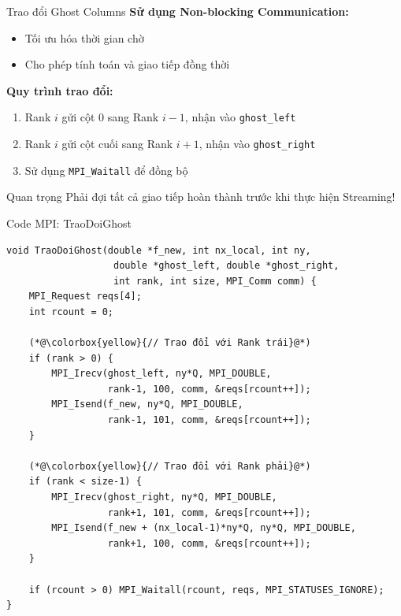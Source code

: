 \documentclass[t, aspectratio=169]{beamer}
\begin{document}
	\begin{frame}{Trao đổi Ghost Columns}
		\textbf{Sử dụng Non-blocking Communication:}
		\begin{itemize}
			\item Tối ưu hóa thời gian chờ
			\item Cho phép tính toán và giao tiếp đồng thời
		\end{itemize}
		
		\vspace{1em}
		
		\textbf{Quy trình trao đổi:}
		\begin{enumerate}
			\item Rank $i$ gửi cột 0 sang Rank $i-1$, nhận vào \texttt{ghost\_left}
			\item Rank $i$ gửi cột cuối sang Rank $i+1$, nhận vào \texttt{ghost\_right}
			\item Sử dụng \texttt{MPI\_Waitall} để đồng bộ
		\end{enumerate}
		
		\vspace{1em}
		
		\begin{alertblock}{Quan trọng}
			Phải đợi tất cả giao tiếp hoàn thành trước khi thực hiện Streaming!
		\end{alertblock}
	\end{frame}
	
	\begin{frame}[fragile]{Code MPI: TraoDoiGhost}
		\begin{lstlisting}[caption={Hàm trao đổi Ghost Columns}]
void TraoDoiGhost(double *f_new, int nx_local, int ny, 
                   double *ghost_left, double *ghost_right, 
                   int rank, int size, MPI_Comm comm) {
    MPI_Request reqs[4]; 
    int rcount = 0;
    
    (*@\colorbox{yellow}{// Trao đổi với Rank trái}@*)
    if (rank > 0) {
        MPI_Irecv(ghost_left, ny*Q, MPI_DOUBLE, 
                  rank-1, 100, comm, &reqs[rcount++]);
        MPI_Isend(f_new, ny*Q, MPI_DOUBLE, 
                  rank-1, 101, comm, &reqs[rcount++]);
    }
    
    (*@\colorbox{yellow}{// Trao đổi với Rank phải}@*)
    if (rank < size-1) {
        MPI_Irecv(ghost_right, ny*Q, MPI_DOUBLE, 
                  rank+1, 101, comm, &reqs[rcount++]);
        MPI_Isend(f_new + (nx_local-1)*ny*Q, ny*Q, MPI_DOUBLE, 
                  rank+1, 100, comm, &reqs[rcount++]);
    }
    
    if (rcount > 0) MPI_Waitall(rcount, reqs, MPI_STATUSES_IGNORE);
}
		\end{lstlisting}
	\end{frame}
	
\end{document}
